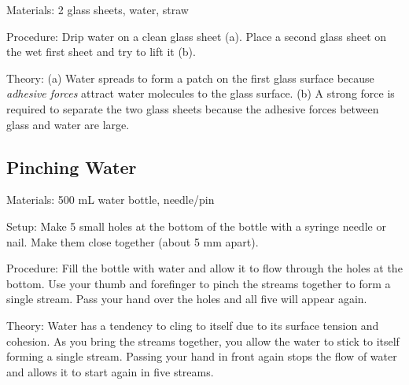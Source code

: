 \begin{multicols}{2}
\begin{description*}
\item[Materials:]{2 glass sheets, water, straw}
\item[Procedure:]{Drip water on a clean glass sheet (a). Place a second glass sheet on the wet first sheet and try to lift it (b).}
\item[Theory:]{(a) Water spreads to form a patch on the first glass surface because \emph{adhesive forces}
attract water molecules to the glass surface.
(b) A strong force is required to separate the two glass sheets because the adhesive forces
between glass and water are large.}
\end{description*}

\subsection{Pinching Water}
\begin{description*}
\item[Materials:]{500 mL water bottle, needle/pin}
\item[Setup:]{Make 5 small holes at the bottom of the bottle with a syringe needle or nail. Make them close together (about 5 mm apart).}
\item[Procedure:]{Fill the bottle with water and allow it to flow through the holes at the bottom. Use your thumb and forefinger to pinch the streams together to form a single stream. Pass your hand over the holes and all five will appear again.}
\item[Theory:]{Water has a tendency to cling to itself due to its surface tension and cohesion. As you bring the streams together, you allow the water to stick to itself forming a single stream. Passing your hand in front again stops the flow of water and allows it to start again in five streams.}
\end{description*}


\end{multicols}
